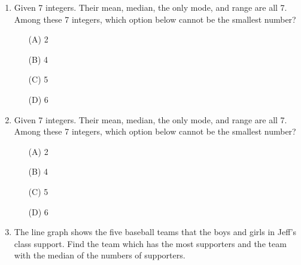 \documentclass[11pt]{scrartcl}
\begin{document}
\begin{enumerate}
\newpage
         \item Given 7 integers. Their mean, median, the only mode, and range are all 7. Among these 7 integers, which option below cannot be the smallest number?
   
   \begin{enumerate}
       \item[(A)] 2
       \item[(B)] 4
       \item[(C)] 5
       \item[(D)] 6
   \end{enumerate}
\vspace{4\baselineskip}

    \item Given 7 integers. Their mean, median, the only mode, and range are all 7. Among these 7 integers, which option below cannot be the smallest number?


    \begin{enumerate}
        \item[(A)] 2
        \item[(B)] 4
        \item[(C)] 5
        \item[(D)] 6
    \end{enumerate}
\vspace{4\baselineskip}

        \item The line graph shows the five baseball teams that the boys and girls in Jeff's class support. Find the team which has the most supporters and the team with the median of the numbers of supporters.

    \begin{center}
    \end{center}


\end{enumerate}
\end{document}
